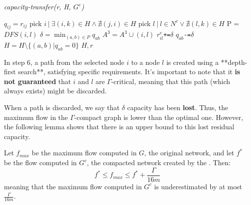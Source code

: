 \begin{algorithm}
    \caption{\textit{capacity-transfer(r, H, $G^c$)}}
    \label{algotrans}
    \begin{algorithmic}[1]
     
            \State $q_{ij} = r_{ij}$
        \EndFor
            \State pick $i\ |\ \exists (i,k)\in H \land\nexists (j,i) \in H$
            \State pick $l\ |\ l\in N^c \lor \nexists (l,k)\in H$
            \State P = $DFS(i, l)$ 
            \State \(\delta = \min_{(a,b)\in P}q_{ab}\)
                \State $A^3 = A^3 \cup {(i,l)}$
                \State $r^c_{il} $\verb|+=|$ \delta$
            \EndIf
                \State  $q_{ab} $\verb|-=|$ \delta$
            \EndFor
            \State $H = H\setminus \{(a,b) | q_{ab} = 0\}$ 
        \EndWhile 
        \Return $H, r$ 
    \end{algorithmic}
\end{algorithm}

In step 6, a path from the selected node \( i \) to a node \( l \) is created using a **depth-first search**, satisfying specific requirements. It's important to note that it \textbf{is not guaranteed} that \( i \) and \( l \) are \(\Gamma\)-critical, meaning that this path (which always exists) might be discarded.

When a path is discarded, we say that \(\delta\) capacity has been \textbf{lost}. Thus, the maximum flow in the \(\Gamma\)-compact graph is lower than the optimal one. However, the following lemma shows that there is an upper bound to this lost residual capacity.

\begin{lemma} \label{boundlose}
    Let \( f_{max} \) be the maximum flow computed in \( G \), the original network, and let \( f^* \) be the flow computed in \( G^c \), the compacted network created by the .
    Then:
    \[
    f^* \leq f_{max} \leq f^* + \frac{\Gamma}{16m}
    \]
    meaning that the maximum flow computed in \( G^c \) is underestimated by at most \( \frac{\Gamma}{16m} \).
\end{lemma}

